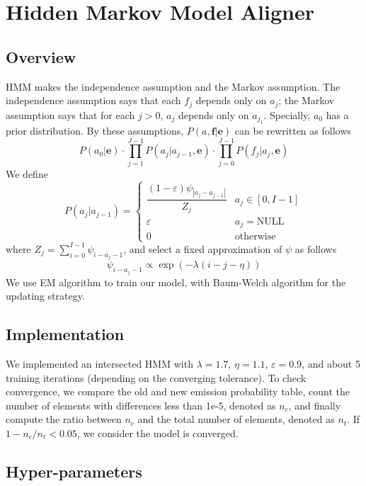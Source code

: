 \documentclass[11pt,a4paper]{article}
\begin{document}
\section{Hidden Markov Model Aligner}
\subsection{Overview}
HMM makes the independence assumption and the Markov assumption. The independence assumption says that each $f_j$ depends only on $a_j$; the Markov assumption says that for each $j > 0$, $a_j$ depends only on $a_{j_1}$. Specially, $a_0$ has a prior distribution. By these assumptions, $P(a, \mathbf{f}|\mathbf{e})$ can be rewritten as follows
\[
  P(a_0|\mathbf{e})\cdot\prod\limits_{j=1}^{J-1}P(a_j|a_{j-1},\mathbf{e})\cdot \prod\limits_{j=0}^{J-1}P(f_j|a_j,\mathbf{e})
\] 
We define 
\[ 
  P(a_j|a_{j-1}) = 
  \begin{cases} 
    \dfrac{(1-\varepsilon)\psi_{|a_j-a_{j-1}|}}{Z_j} & a_j \in [0,I-1] \\
    \varepsilon & a_j = \text{NULL} \\
    0 & \text{otherwise}
  \end{cases}
\] where $Z_j = \sum\limits_{i=0}^{I-1}\psi_{i-a_j-1}$, and select a fixed approximation of $\psi$ as follows
\[
  \psi_{i-a_j-1}\propto \exp (-\lambda (i-j-\eta))
\] We use EM algorithm to train our model, with Baum-Welch \cite{baum1970maximization} algorithm for the updating strategy.

\subsection{Implementation}
We implemented an intersected HMM with $\lambda = 1.7$, $\eta = 1.1$, $\varepsilon = 0.9$, and about 5 training iterations (depending on the converging tolerance). To check convergence, we compare the old and new emission probability table, count the number of elements with differences less than 1e-5, denoted as $n_c$, and finally compute the ratio between $n_c$ and the total number of elements, denoted as $n_t$. If $1-n_c/n_t < 0.05$, we consider the model is converged.

\subsection{Hyper-parameters}
\end{document}
